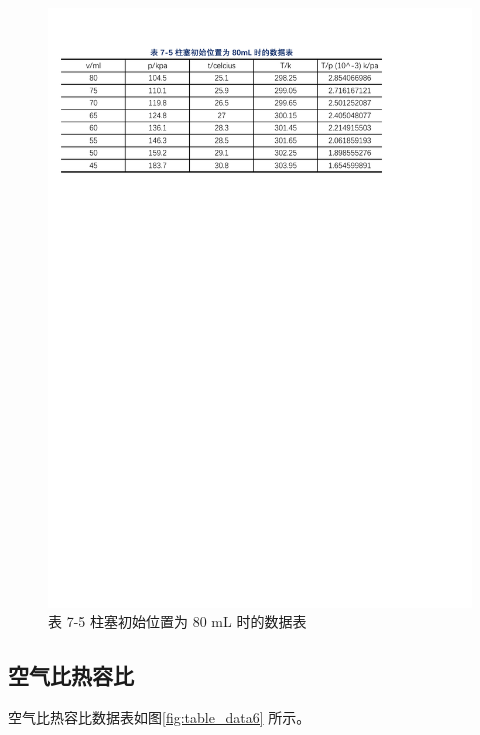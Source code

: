 \documentclass[12pt]{article}
\begin{document}
\begin{figure}[H] %
    \centering
    \includegraphics[width=\textwidth]{./figures/T7-5.pdf} 
    \caption{表 7-5 柱塞初始位置为 80 mL 时的数据表}
    \label{fig:table_data5}
\end{figure}

\subsection{\normalfont 空气比热容比}

空气比热容比数据表如图\ref{fig:table_data6} 所示。
\end{document}
